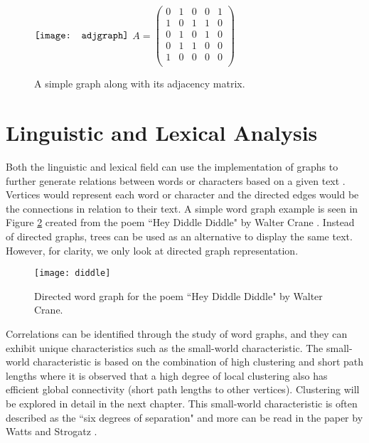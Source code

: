 \begin{figure}[!htb]
\centering
$\vcenter{\hbox{\texttt{[image: adjgraph]}}}$
\hfill
$A = \begin{pmatrix}
0 & 1 & 0 & 0 & 1 \\
1 & 0 & 1 & 1 & 0 \\
0 & 1 & 0 & 1 & 0 \\
0 & 1 & 1 & 0 & 0 \\
1 & 0 & 0 & 0 & 0 \\
\end{pmatrix} $
\caption{A simple graph along with its adjacency matrix.}
\label{fig:Adjacency Graph}
\end{figure}

\section{Linguistic and Lexical Analysis}
Both the linguistic and lexical field can use the implementation of graphs to further generate relations between words or characters based on a given text \cite{vitevitch2008can}. Vertices would represent each word or character and the directed edges would be the connections in relation to their text. A simple word graph example is seen in Figure \ref{fig:diddle} created from the poem ``Hey Diddle Diddle" by Walter Crane \cite{crane2016baby}. Instead of directed graphs, trees can be used as an alternative to display the same text. However, for clarity, we only look at directed graph representation. 

\begin{figure}[!htb]
\centering
\texttt{[image: diddle]}
\caption{Directed word graph for the poem ``Hey Diddle Diddle" by Walter Crane.}
\label{fig:diddle}
\end{figure}

Correlations can be identified through the study of word graphs, and they can exhibit unique characteristics such as the small-world characteristic. The small-world characteristic is based on the combination of high clustering and short path lengths where it is observed that a high degree of local clustering also has efficient global connectivity (short path lengths to other vertices). Clustering will be explored in detail in the next chapter. This small-world characteristic is often described as the ``six degrees of separation" and more can be read in the paper by Watts and Strogatz \cite{watts1998collective}. 

